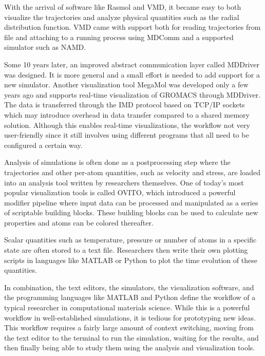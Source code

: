 \documentclass[12pt,a4paper,final]{iopart}
\begin{document}
With the arrival of software like Rasmol\cite{sayle1995rasmol} and VMD\cite{Humphrey1996Vmd},
it became easy to both visualize the trajectories and analyze physical quantities such as the radial distribution function.
VMD came with support both for reading trajectories from file and attaching to a
running process using MDComm\cite{nelson1995mdscope} and a supported simulator such as NAMD.

Some 10 years later, an improved abstract communication layer called MDDriver\cite{delalande2009complex} was designed.
It is more general and a small effort is needed to add support for a new simulator. Another visualization tool MegaMol\cite{grottel2015megamol} was developed
only a few years ago and supports real-time visualization of GROMACS through MDDriver.
The data is transferred through the IMD protocol based on TCP/IP sockets\cite{delalande2009complex} which may introduce
overhead in data transfer compared to a shared memory solution.
Although this enables real-time visualizations, the workflow not very user-friendly since it still involves
using different programs that all need to be configured a certain way.

Analysis of simulations is often done as a postprocessing step where the trajectories and other 
per-atom quantities, such as velocity and stress, are loaded into an analysis tool written by researchers themselves.
One of today's most popular visualization tools is called OVITO\cite{Stukowski2009Visualization},
which introduced a powerful modifier pipeline where input data can be processed and manipulated as a series of scriptable building blocks.
These building blocks can be used to calculate new properties and atoms can be colored thereafter.

Scalar quantities such as temperature, pressure or number of atoms in a specific state are often stored to a
text file. Researchers then write their own plotting scripts in languages like MATLAB or Python
to plot the time evolution of these quantities. 

In combination, the text editors, the simulators, the visualization software, and the programming
languages like MATLAB and Python define the workflow of a typical researcher in computational
materials science.
While this is a powerful workflow in well-established simulations,
it is tedious for prototyping new ideas.
This workflow requires a fairly large amount of context switching,
moving from the text editor to the terminal to run the simulation,
waiting for the results, and then finally being able to study them using the analysis
and visualization tools.
\end{document}
